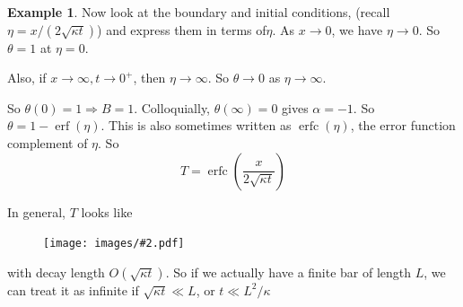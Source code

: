 \documentclass[a4paper]{article}
\theoremstyle{definition}
\newtheorem*{eg}{Example}
\newcommand{\img}[2][]{\begin{figure}[ht]\centering\texttt{[image: images/\#2.pdf]}\end{figure}}
\DeclareMathOperator\erf{erf}
\DeclareMathOperator\erfc{erfc}
\begin{document}
\begin{eg}
Now look at the boundary and initial conditions, (recall $\eta = x/(2\sqrt{\kappa t})$) and express them in terms of$\eta$. As $x \to 0$, we have $\eta \to 0$. So $\theta = 1$ at $\eta = 0$.

Also, if $x\to \infty, t\to 0^+$, then $\eta \to \infty$. So $\theta \to 0$ as $\eta \to \infty$.

So $\theta(0) = 1 \Rightarrow B = 1$. Colloquially, $\theta(\infty) = 0$ gives $\alpha = -1$. So $\theta = 1 - \erf(\eta)$. This is also sometimes written as $\erfc(\eta)$, the error function complement of $\eta$. So
\[
T = \erfc\left(\frac{x}{2\sqrt{\kappa t}}\right)
\]

In general, $T$ looks like

\img[width=200pt]{de_34}

with decay length $O(\sqrt{\kappa t})$. So if we actually have a finite bar of length $L$, we can treat it as infinite if $\sqrt{\kappa t} \ll L$, or $t\ll L^2/\kappa$
\end{eg}
\end{document}

